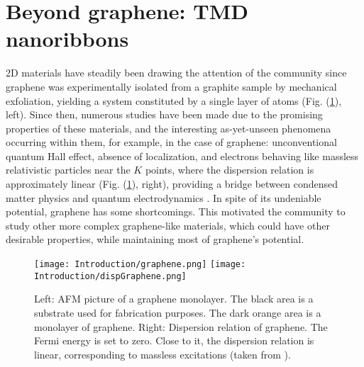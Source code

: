 \section{Beyond graphene: TMD nanoribbons}
\label{sec:state}

\ac{2D} materials have steadily been drawing the attention of the community since graphene was experimentally isolated from a graphite sample by mechanical exfoliation, yielding a system constituted by a single layer of atoms (Fig. (\ref{fig:graphene}), left).
Since then, numerous studies have been made due to the promising properties of these materials, and the interesting as-yet-unseen phenomena occurring within them, for example, in the case of graphene: unconventional quantum Hall effect, absence of localization, and electrons behaving like massless relativistic particles near the $K$ points, where the dispersion relation is approximately linear (Fig. (\ref{fig:graphene}), right), providing a bridge between condensed matter physics and quantum electrodynamics \cite{katsnelson_graphene:_2007}.
In spite of its undeniable potential, graphene has some shortcomings.
This motivated the community to study other more complex graphene-like materials, which could have other desirable properties, while maintaining most of graphene's potential.

\begin{figure}[H]
\hspace{1.5cm}
\texttt{[image: Introduction/graphene.png]}
\hspace{2.5cm}
\texttt{[image: Introduction/dispGraphene.png]}
\caption[Graphene monolayer; graphene's dispersion relation.]{Left: \acf{AFM} picture of a graphene monolayer. The black area is a substrate used for fabrication purposes. The dark orange area is a monolayer of graphene. Right: Dispersion relation of graphene. The Fermi energy is set to zero. Close to it, the dispersion relation is linear, corresponding to massless excitations (taken from \cite{castro_neto_electronic_2009}). }
\label{fig:graphene}
\end{figure}	

